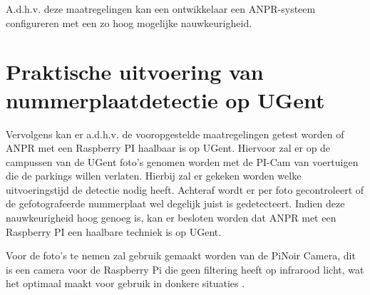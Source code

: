 A.d.h.v. deze maatregelingen kan een ontwikkelaar een ANPR-systeem configureren met een zo hoog mogelijke nauwkeurigheid. 

\section{Praktische uitvoering van nummerplaatdetectie op UGent}
Vervolgens kan er a.d.h.v. de vooropgestelde maatregelingen getest worden of ANPR met een Raspberry PI haalbaar is op UGent. Hiervoor zal er op de campussen van de UGent foto's genomen worden met de PI-Cam van voertuigen die de parkings willen verlaten. Hierbij zal er gekeken worden welke uitvoeringstijd de detectie nodig heeft. Achteraf wordt er per foto gecontroleert of de gefotografeerde nummerplaat wel degelijk juist is gedetecteert. Indien deze nauwkeurigheid hoog genoeg is, kan er besloten worden dat ANPR met een Raspberry PI een haalbare techniek is op UGent.

Voor de foto's te nemen zal gebruik gemaakt worden van de PiNoir Camera, dit is een camera voor de Raspberry Pi die geen filtering heeft op infrarood licht, wat het optimaal maakt voor gebruik in donkere situaties \autocite{raspberrypisitemodelpinoir}.